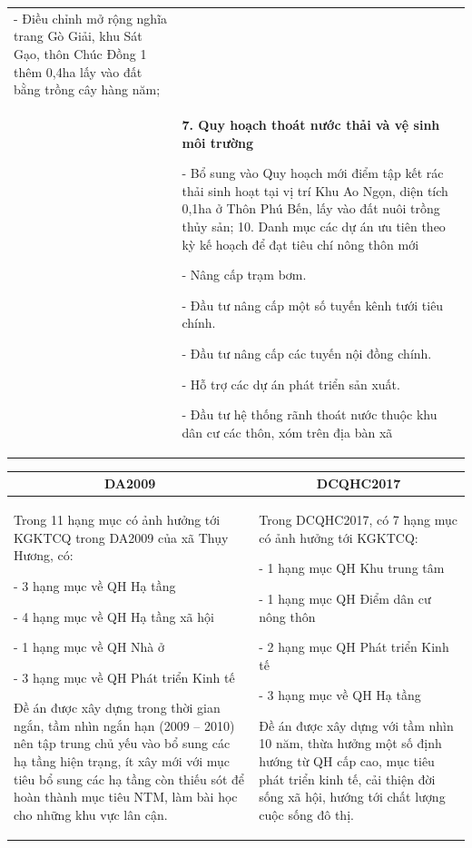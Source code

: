 \documentclass[../thesis.tex]{subfiles}
\begin{document}
\begin{landscape}
\begin{longtable}{ | m{3cm} | m{18cm}| }
\par -  Điều chỉnh mở rộng nghĩa trang Gò Giải, khu Sát Gạo, thôn Chúc Đồng 1 thêm 0,4ha lấy vào đất bằng trồng cây hàng năm; \\&\textbf{ 7. Quy hoạch thoát nước thải và vệ sinh môi trường} \par -  Bổ sung vào Quy hoạch mới điểm tập kết rác thải sinh hoạt tại vị trí Khu Ao Ngọn, diện tích 0,1ha ở Thôn Phú Bến, lấy vào đất nuôi trồng thủy sản; 10. Danh mục các dự án ưu tiên theo kỳ kế hoạch để đạt tiêu chí nông thôn mới \par -  Nâng cấp trạm bơm. \par -  Đầu tư nâng cấp một số tuyến kênh tưới tiêu chính. \par -  Đầu tư nâng cấp các tuyến nội đồng chính. \par -  Hỗ trợ các dự án phát triển sản xuất. \par -  Đầu tư hệ thống rãnh thoát nước thuộc khu dân cư các thôn, xóm trên địa bàn xã    \\
\hline
\end{longtable}
\end{landscape}

\begin{table}[h!]
\centering
\begin{tabular}{ | m{7.5cm} | m{7.5cm}| } 
\hline      
\multicolumn{1}{|c|}{\textbf{DA2009}}& \multicolumn{1}{c|}{\textbf{DCQHC2017}} \\
\hline  
Trong 11 hạng mục có ảnh hưởng tới KGKTCQ trong DA2009 của xã Thụy Hương, có: \par - 3 hạng mục về QH Hạ tầng  \par - 4 hạng mục về QH Hạ tầng xã hội\par  - 1 hạng mục về QH Nhà ở \par - 3 hạng mục về QH Phát triển Kinh tế \par Đề án được xây dựng trong thời gian ngắn, tầm nhìn ngắn hạn (2009 – 2010) nên tập trung chủ yếu vào bổ sung các hạ tầng hiện trạng, ít xây mới với mục tiêu bổ sung các hạ tầng còn thiếu sót để hoàn thành mục tiêu NTM, làm bài học cho những khu vực lân cận. &Trong DCQHC2017, có 7 hạng mục có ảnh hưởng tới KGKTCQ: \par - 1 hạng mục QH Khu trung tâm  \par - 1 hạng mục QH Điểm dân cư nông thôn  \par - 2 hạng mục QH Phát triển Kinh tế  \par - 3 hạng mục về QH Hạ tầng  \par Đề án được xây dựng với tầm nhìn 10 năm, thừa hưởng một số định hướng từ QH cấp cao, mục tiêu phát triển kinh tế, cải thiện đời sống xã hội, hướng tới chất lượng cuộc sống đô thị. \\
\hline 
\end{tabular}
\end{table}
\end{document}

